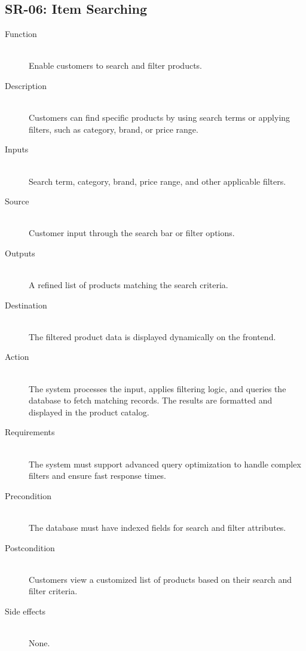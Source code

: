 \documentclass[twoside,a4paper,journal]{IEEEtran}
\begin{document}
\subsection{SR-06: Item Searching}
\begin{description}
  \item[Function] \hfill \\
  Enable customers to
  search and filter products.
  \item[Description] \hfill \\
  Customers can find specific products by using search
  terms or applying filters, such as category, brand, or price range.
  \item[Inputs] \hfill \\
  Search term,
  category, brand, price range, and other applicable filters.
  \item[Source] \hfill \\
  Customer input through the search bar or filter
  options.
  \item[Outputs] \hfill \\
  A refined list of products matching the search
  criteria.
  \item[Destination] \hfill \\
  The filtered product data is displayed dynamically on
  the frontend.
  \item[Action] \hfill \\
  The system processes the input, applies filtering
  logic, and queries the database to fetch matching records. The results are
  formatted and displayed in the product catalog.
  \item[Requirements] \hfill \\
  The system must support advanced query optimization
  to handle complex filters and ensure fast response times.
  \item[Precondition] \hfill \\
  The database must have indexed fields for search and
  filter attributes.
  \item[Postcondition] \hfill \\
  Customers view a customized list of products based on
  their search and filter criteria.
  \item[Side effects] \hfill \\
  None.
\end{description}
\end{document}
